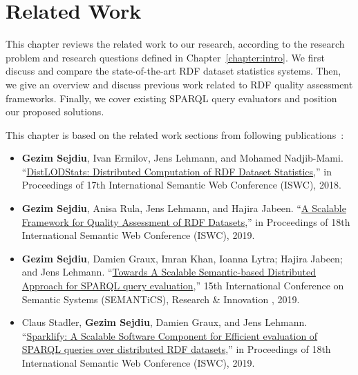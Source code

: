 \chapter{Related Work}
\label{chapter:related}

This chapter reviews the related work to our research, according to the research problem and research questions defined in Chapter~\ref{chapter:intro}.
We first discuss and compare the state-of-the-art \gls{RDF} dataset statistics systems.
Then, we give an overview and discuss previous work related to \gls{RDF} quality assessment frameworks. 
Finally, we cover existing \gls{SPARQL} query evaluators and position our proposed solutions. 

This chapter is based on the related work sections from following publications~\cite{sejdiu-2018-dist-lod-stats-iswc,sejdiu-2019-sansa-dist-quality-assessment-iswc,sejdiu-2019-sansa-semantic-based-semantics, 2019-sansa-sparklify-iswc}:

\begin{itemize}
    \item \textbf{Gezim Sejdiu}, Ivan Ermilov, Jens Lehmann, and Mohamed Nadjib-Mami. “\href{http://jens-lehmann.org/files/2018/iswc_distlodstats.pdf}{DistLODStats: Distributed Computation of RDF Dataset Statistics},” in Proceedings of 17th International Semantic Web Conference (ISWC), 2018.
    
    \item \textbf{Gezim Sejdiu}, Anisa Rula, Jens Lehmann, and Hajira Jabeen. “\href{http://jens-lehmann.org/files/2019/iswc_dist_quality_assessment.pdf}{A Scalable Framework for Quality Assessment of RDF Datasets},” in Proceedings of 18th International Semantic Web Conference (ISWC), 2019.
    
    \item \textbf{Gezim Sejdiu}, Damien Graux, Imran Khan, Ioanna Lytra; Hajira Jabeen; and Jens Lehmann. “\href{https://gezimsejdiu.github.io/publications/semantic_based_query_paper_SEMANTICS2019.pdf}{Towards A Scalable Semantic-based Distributed Approach for SPARQL query evaluation},” 15th International Conference on Semantic Systems (SEMANTiCS), Research \& Innovation , 2019.
     
    \item Claus Stadler, \textbf{Gezim Sejdiu}, Damien Graux, and Jens Lehmann. “\href{http://jens-lehmann.org/files/2019/iswc_sparklify.pdf}{Sparklify: A Scalable Software Component for Efficient evaluation of SPARQL queries over distributed RDF datasets},” in Proceedings of 18th International Semantic Web Conference (ISWC), 2019. 
    
\end{itemize}

